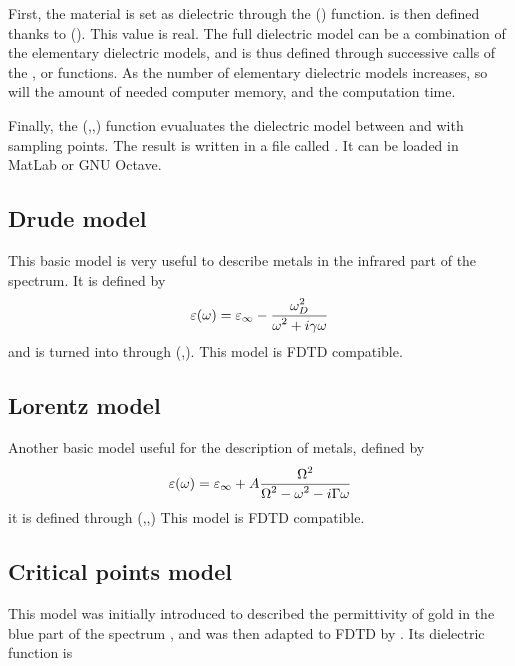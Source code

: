 	First, the material is set as dielectric through the () function. \lft{$\varepsilon_\infty$} is then defined thanks to (\lft{$\varepsilon_\infty$}). This value is real. The full dielectric model can be a combination of the elementary dielectric models, and is thus defined through successive calls of the ,  or  functions. As the number of elementary dielectric models increases, so will the amount of needed computer memory, and the computation time.
	
	Finally, the (,,) function evualuates the dielectric model between  and  with  sampling points. The result is written in a file called . It can be loaded in MatLab or GNU Octave.

\subsection{Drude model}

This basic model is very useful to describe metals in the infrared part of the spectrum. It is defined by
\begin{equation}
\varepsilon(\omega)=\varepsilon_\infty-\frac{\displaystyle \omega_D^2}{\displaystyle \omega^2+i\gamma\omega}
\end{equation}
and is turned into through (,\lft{$\gamma$}). This model is FDTD compatible.

\subsection{Lorentz model}

Another basic model useful for the description of metals, defined by
\begin{equation}
\varepsilon(\omega)=\varepsilon_\infty+A\frac{\displaystyle \Omega^2}{\displaystyle \Omega^2-\omega^2-i\Gamma\omega}
\end{equation}
it is defined through (,\lft{$\Omega$},\lft{$\Gamma$}) This model is FDTD compatible.

\subsection{Critical points model}

This model was initially introduced to described the permittivity of gold in the blue part of the spectrum \cite{Etchegoin:06}, and was then adapted to FDTD by \cite{Vial:07}. Its dielectric function is
	

